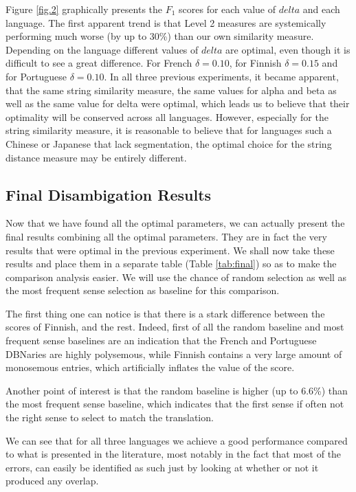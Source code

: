 \documentclass[10pt,a4paper,twoside]{article}
\begin{document}
Figure \ref{fig.2} graphically presents the \(F_1\) scores for each value of \(delta\) and each language. The first apparent trend is that Level 2 measures are systemically performing much worse (by up to 30\%) than our own similarity measure. Depending on the language different values of \(delta\) are optimal, even though it is difficult to see a great difference. For French \(\delta=0.10\), for Finnish \(\delta=0.15\)
 and for Portuguese \(\delta=0.10\). 
In all three previous experiments, it became apparent, that the same string similarity measure, the same values for alpha and beta as well as the same value for delta were optimal, which leads us to believe that their optimality will be conserved across all languages. However, especially for the string similarity measure, it is reasonable to believe that for languages such a Chinese or Japanese that lack segmentation, the optimal choice for the string distance measure may be entirely different.
\subsection{Final Disambigation Results}

Now that we have found all the optimal parameters, we can actually present the final results combining all the optimal parameters. They are in fact the very results that were optimal in the previous experiment. We shall now take these results and place them in a separate table (Table \ref{tab:final}) so as to make the comparison analysis easier. We will use the chance of random selection as well as the most frequent sense selection as baseline for this comparison.

The first thing one can notice is that there is a stark difference between the scores of Finnish, and the rest. Indeed, first of all the random baseline and most frequent sense baselines are an indication that the French and Portuguese DBNaries are highly polysemous, while Finnish contains a very large amount of monosemous entries, which artificially inflates the value of the score. 

Another point of interest is that the random baseline is higher (up to 6.6\%) than the most frequent sense baseline, which indicates that the first sense if often not the right sense to select to match the translation. 

We can see that for all three languages we achieve a good performance compared to what is presented in the literature, most notably in the fact that most of the errors, can easily be identified as such just by looking at whether or not it produced any overlap.
\end{document}
